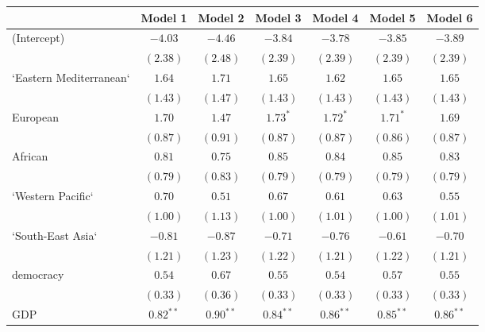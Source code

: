 
\begin{table}[!h]
\begin{center}
\begin{tabular}{l c c c c c c }
\toprule
 & Model 1 & Model 2 & Model 3 & Model 4 & Model 5 & Model 6 \\
\midrule
(Intercept)             & $-4.03$      & $-4.46$      & $-3.84$      & $-3.78$      & $-3.85$      & $-3.89$      \\
                        & $(2.38)$     & $(2.48)$     & $(2.39)$     & $(2.39)$     & $(2.39)$     & $(2.39)$     \\
`Eastern Mediterranean` & $1.64$       & $1.71$       & $1.65$       & $1.62$       & $1.65$       & $1.65$       \\
                        & $(1.43)$     & $(1.47)$     & $(1.43)$     & $(1.43)$     & $(1.43)$     & $(1.43)$     \\
European                & $1.70$       & $1.47$       & $1.73^{*}$   & $1.72^{*}$   & $1.71^{*}$   & $1.69$       \\
                        & $(0.87)$     & $(0.91)$     & $(0.87)$     & $(0.87)$     & $(0.86)$     & $(0.87)$     \\
African                 & $0.81$       & $0.75$       & $0.85$       & $0.84$       & $0.85$       & $0.83$       \\
                        & $(0.79)$     & $(0.83)$     & $(0.79)$     & $(0.79)$     & $(0.79)$     & $(0.79)$     \\
`Western Pacific`       & $0.70$       & $0.51$       & $0.67$       & $0.61$       & $0.63$       & $0.55$       \\
                        & $(1.00)$     & $(1.13)$     & $(1.00)$     & $(1.01)$     & $(1.00)$     & $(1.01)$     \\
`South-East Asia`       & $-0.81$      & $-0.87$      & $-0.71$      & $-0.76$      & $-0.61$      & $-0.70$      \\
                        & $(1.21)$     & $(1.23)$     & $(1.22)$     & $(1.21)$     & $(1.22)$     & $(1.21)$     \\
democracy               & $0.54$       & $0.67$       & $0.55$       & $0.54$       & $0.57$       & $0.55$       \\
                        & $(0.33)$     & $(0.36)$     & $(0.33)$     & $(0.33)$     & $(0.33)$     & $(0.33)$     \\
GDP                     & $0.82^{**}$  & $0.90^{**}$  & $0.84^{**}$  & $0.86^{**}$  & $0.85^{**}$  & $0.86^{**}$  \\

\end{tabular}
\end{center}
\end{table}
